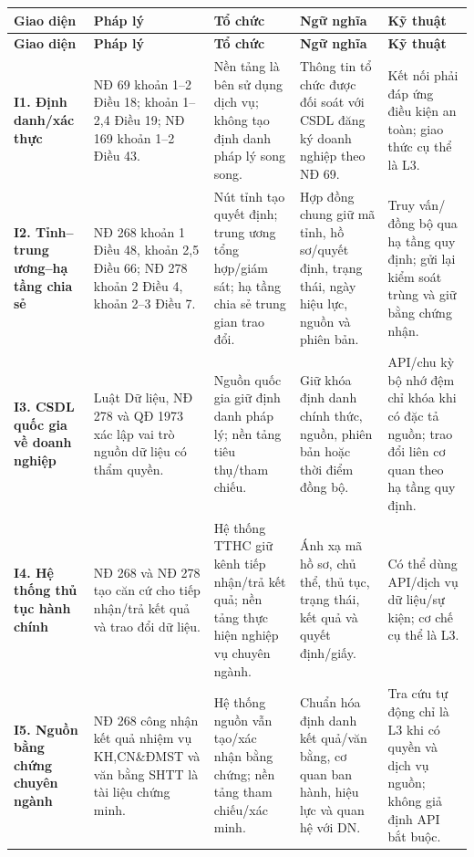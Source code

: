 \documentclass[a4paper,11pt]{article}
\begin{document}
\small
\setlength{\tabcolsep}{2.5pt}
\renewcommand{\arraystretch}{1.02}
\begin{longtable}{@{}p{2.45cm}p{3.0cm}p{3.0cm}p{3.0cm}p{3.0cm}@{}}
\toprule
\textbf{Giao diện} & \textbf{Pháp lý} & \textbf{Tổ chức} & \textbf{Ngữ nghĩa} & \textbf{Kỹ thuật} \\
\midrule
\endfirsthead
\toprule
\textbf{Giao diện} & \textbf{Pháp lý} & \textbf{Tổ chức} & \textbf{Ngữ nghĩa} & \textbf{Kỹ thuật} \\
\midrule
\endhead
\bottomrule
\endfoot
\textbf{I1. Định danh/xác thực} & NĐ 69 khoản 1--2 Điều 18; khoản 1--2,4 Điều 19; NĐ 169 khoản 1--2 Điều 43. & Nền tảng là bên sử dụng dịch vụ; không tạo định danh pháp lý song song. & Thông tin tổ chức được đối soát với CSDL đăng ký doanh nghiệp theo NĐ 69. & Kết nối phải đáp ứng điều kiện an toàn; giao thức cụ thể là L3. \\
\addlinespace
\textbf{I2. Tỉnh--trung ương--hạ tầng chia sẻ} & NĐ 268 khoản 1 Điều 48, khoản 2,5 Điều 66; NĐ 278 khoản 2 Điều 4, khoản 2--3 Điều 7. & Nút tỉnh tạo quyết định; trung ương tổng hợp/giám sát; hạ tầng chia sẻ trung gian trao đổi. & Hợp đồng chung giữ mã tỉnh, hồ sơ/quyết định, trạng thái, ngày hiệu lực, nguồn và phiên bản. & Truy vấn/đồng bộ qua hạ tầng quy định; gửi lại kiểm soát trùng và giữ bằng chứng nhận. \\
\addlinespace
\textbf{I3. CSDL quốc gia về doanh nghiệp} & Luật Dữ liệu, NĐ 278 và QĐ 1973 xác lập vai trò nguồn dữ liệu có thẩm quyền. & Nguồn quốc gia giữ định danh pháp lý; nền tảng tiêu thụ/tham chiếu. & Giữ khóa định danh chính thức, nguồn, phiên bản hoặc thời điểm đồng bộ. & API/chu kỳ bộ nhớ đệm chỉ khóa khi có đặc tả nguồn; trao đổi liên cơ quan theo hạ tầng quy định. \\
\addlinespace
\textbf{I4. Hệ thống thủ tục hành chính} & NĐ 268 và NĐ 278 tạo căn cứ cho tiếp nhận/trả kết quả và trao đổi dữ liệu. & Hệ thống TTHC giữ kênh tiếp nhận/trả kết quả; nền tảng thực hiện nghiệp vụ chuyên ngành. & Ánh xạ mã hồ sơ, chủ thể, thủ tục, trạng thái, kết quả và quyết định/giấy. & Có thể dùng API/dịch vụ dữ liệu/sự kiện; cơ chế cụ thể là L3. \\
\addlinespace
\textbf{I5. Nguồn bằng chứng chuyên ngành} & NĐ 268 công nhận kết quả nhiệm vụ KH,CN\&ĐMST và văn bằng SHTT là tài liệu chứng minh. & Hệ thống nguồn vẫn tạo/xác nhận bằng chứng; nền tảng tham chiếu/xác minh. & Chuẩn hóa định danh kết quả/văn bằng, cơ quan ban hành, hiệu lực và quan hệ với DN. & Tra cứu tự động chỉ là L3 khi có quyền và dịch vụ nguồn; không giả định API bắt buộc. \\

\end{longtable}
\end{document}
